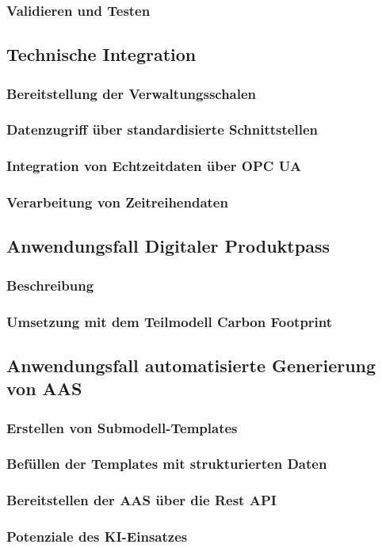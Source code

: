 \subsubsection{Validieren und Testen}
\subsection{Technische Integration}
\subsubsection{Bereitstellung der Verwaltungsschalen}
\subsubsection{Datenzugriff über standardisierte Schnittstellen}
\subsubsection{Integration von Echtzeitdaten über OPC UA}
\subsubsection{Verarbeitung von Zeitreihendaten}
\subsection{Anwendungsfall Digitaler Produktpass}
\subsubsection{Beschreibung}
\subsubsection{Umsetzung mit dem Teilmodell Carbon Footprint}
\subsection{Anwendungsfall automatisierte Generierung von AAS}
\subsubsection{Erstellen von Submodell-Templates}
\subsubsection{Befüllen der Templates mit strukturierten Daten}
\subsubsection{Bereitstellen der AAS über die Rest API}
\subsubsection{Potenziale des KI-Einsatzes}